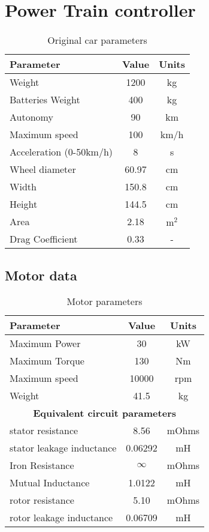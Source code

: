\chapter{Power Train controller}
\blindtext

\begin{table}
	\centering
	\begin{tabular}{lcc}
		\toprule
		\textbf{Parameter} & \textbf{Value} & \textbf{Units}\\
		\midrule
		Weight & 1200 & kg\\
		Batteries Weight & 400 & kg\\
		Autonomy & 90 & km \\
		Maximum speed & 100 & km/h \\
		Acceleration (0-50km/h) & 8 & s \\
		Wheel diameter & 60.97 & cm \\
		Width & 150.8 & cm \\
		Height & 144.5 & cm \\
		Area & 2.18 & $\text{m}^2$ \\
		Drag Coefficient & 0.33 & - \\
		\bottomrule
	\end{tabular}
	\caption{Original car parameters}
	\label{tab:car_parameters}
\end{table}



\section{Motor data}

\blindtext

\begin{table}
	\centering
	\begin{tabular}{lcc}
		\toprule
		\textbf{Parameter} & \textbf{Value} & \textbf{Units}\\
		\midrule
		Maximum Power & 30 & kW\\  
		Maximum Torque & 130 & Nm \\
		Maximum speed & 10000 & rpm \\
		Weight & 41.5 & kg \\
		\midrule
		\multicolumn{3}{c}{\textbf{Equivalent circuit parameters}}\\
		\midrule
		stator resistance & 8.56 & mOhms \\
		stator leakage inductance & 0.06292 & mH \\
		Iron Resistance & $\infty$ & mOhms\\
		Mutual Inductance & 1.0122 & mH \\
		rotor resistance & 5.10 & mOhms \\
		rotor leakage inductance & 0.06709 & mH \\
		\bottomrule
	\end{tabular}
	\caption{Motor parameters}
	\label{tab:motor_parameters}
\end{table}

